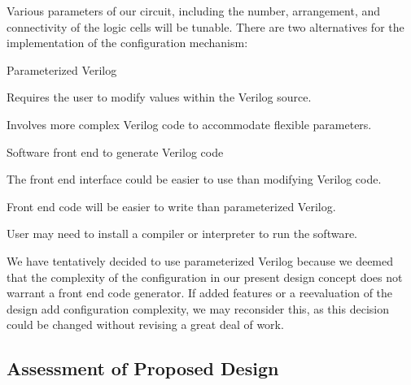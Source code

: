 Various parameters of our circuit, including the number, arrangement, and connectivity of the logic cells will be tunable.
There are two alternatives for the implementation of the configuration mechanism:
\begin{enumeration}
	\item Parameterized Verilog \
		\begin{itemlist}
			\item Requires the user to modify values within the Verilog source.
			\item Involves more complex Verilog code to accommodate flexible parameters.
		\end{itemlist}
	\item Software front end to generate Verilog code \
		\begin{itemlist}
			\item The front end interface could be easier to use than modifying Verilog code.
			\item Front end code will be easier to write than parameterized Verilog.
			\item User may need to install a compiler or interpreter to run the software.
		\end{itemlist}
\end{enumeration}

We have tentatively decided to use parameterized Verilog because we deemed that the complexity of the configuration in our present design concept does not warrant a front end code generator.
If added features or a reevaluation of the design add configuration complexity, we may reconsider this, as this decision could be changed without revising a great deal of work.



\subsection{Assessment of Proposed Design} %


